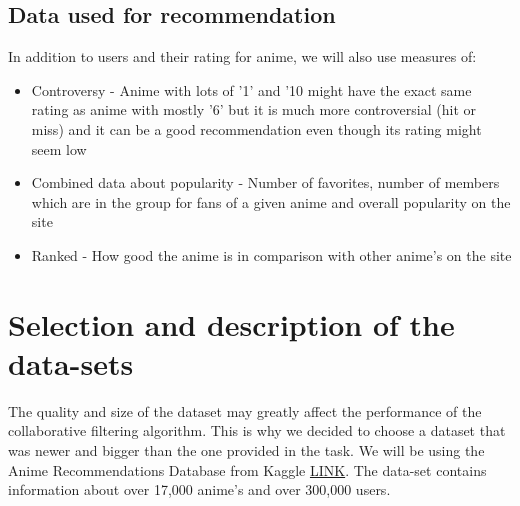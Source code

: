 \documentclass[12pt]{article}
\begin{document}
\subsection{Data used for recommendation}
In addition to users and their rating for anime, we will also use measures of:
\begin{itemize}
\item Controversy - Anime with lots of ’1’ and ’10 might have the exact same rating as anime with mostly ’6’ but it is much more
controversial (hit or miss) and it can be a good recommendation even though its rating might seem low
\item Combined data about popularity - Number of favorites, number of members which are in the group for fans of a given anime and overall popularity on the site
\item Ranked - How good the anime is in  comparison with other anime's on the site 
\end{itemize}





\section{Selection and description of the data-sets}
The quality and size of the dataset may greatly affect the performance of the collaborative filtering algorithm. This is why we decided to choose a dataset that was newer and bigger than the one provided in the task.
We will be using the Anime Recommendations Database from Kaggle \href{https://www.kaggle.com/datasets/hernan4444/anime-recommendation-database-2020}{LINK}. The data-set contains information about over 17,000 anime's and over 300,000 users. \\ 
\end{document}
